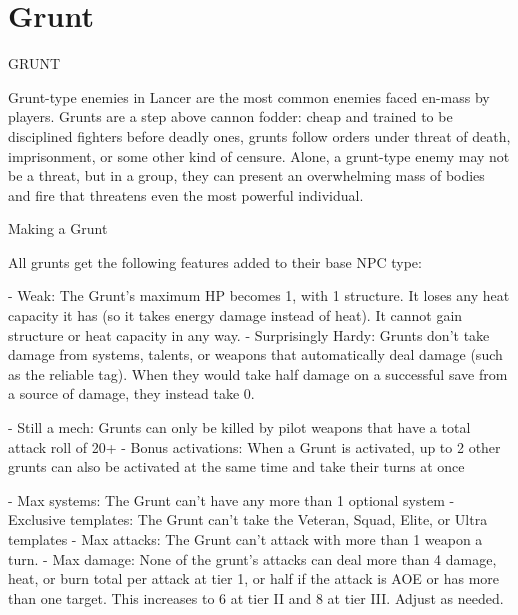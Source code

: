 \section{Grunt}
                                                 GRUNT   

Grunt-type enemies in Lancer are the most common enemies faced en-mass by players. Grunts  
are a step above cannon fodder: cheap and trained to be disciplined fighters before deadly ones,  
grunts follow orders under threat of death, imprisonment, or some other kind of censure. Alone, a  
grunt-type enemy may not be a threat, but in a group, they can present an overwhelming mass of  
bodies and fire that threatens even the most powerful individual.   

Making a Grunt
 
All grunts get the following features added to their base NPC type:
 
    -   Weak: The Grunt’s maximum HP becomes 1, with 1 structure. It loses any heat capacity it  
         has (so it takes energy damage instead of heat). It cannot gain structure or heat capacity  
         in any way.  
    -   Surprisingly Hardy: Grunts don’t take damage from systems, talents, or weapons that  
        automatically deal damage (such as the reliable tag). When they would take half damage  
        on a successful save from a source of damage, they instead take 0.
 
    -   Still a mech: Grunts can only be killed by pilot weapons that have a total attack roll of  
        20+  
    -    Bonus activations: When a Grunt is activated, up to 2 other grunts can also be activated  
        at the same time and take their turns at once
 
    -    Max systems: The Grunt can’t have any more than 1 optional system  
    -    Exclusive templates: The Grunt can’t take the Veteran, Squad, Elite, or Ultra templates  
    -    Max attacks: The Grunt can’t attack with more than 1 weapon a turn.  
    -    Max damage: None of the grunt’s attacks can deal more than 4 damage, heat, or burn  
        total per attack at tier 1, or half if the attack is AOE or has more than one target. This  
         increases to 6 at tier II and 8 at tier III. Adjust as needed.  
